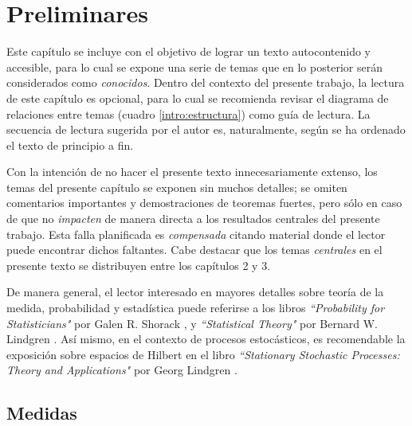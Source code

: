 
\chapter{Preliminares}

Este capítulo se incluye con el objetivo de lograr un texto autocontenido y accesible, para lo cual se expone una serie de temas que en lo posterior serán considerados como \textit{conocidos}.
%
Dentro del contexto del presente trabajo, la lectura de este capítulo es opcional, para lo cual se recomienda revisar el diagrama de relaciones entre temas (cuadro \ref{intro:estructura}) como guía de lectura.
%
La secuencia de lectura sugerida por el autor es, naturalmente, según se ha ordenado el texto de principio a fin.

Con la intención de no hacer el presente texto innecesariamente extenso, los temas del presente capítulo se exponen sin muchos detalles; se omiten comentarios importantes y demostraciones de teoremas fuertes, pero sólo en caso de que no \textit{impacten} de manera directa a los resultados centrales del presente trabajo.
%
Esta falla planificada es \textit{compensada} citando material donde el lector puede encontrar dichos faltantes.
%
Cabe destacar que los temas \textit{centrales} en el presente texto se distribuyen entre los capítulos 2 y 3.

De manera general, el lector interesado en mayores detalles sobre teoría de la medida, probabilidad y estadística puede referirse a los libros \textit{``Probability for Statisticians"} por Galen R. Shorack \cite{probabilidad_shorack}, y \textit{``Statistical Theory"} por Bernard W. Lindgren \cite{estadistica_lindgren}.
%
Así mismo, en el contexto de procesos estocásticos, es recomendable la exposición sobre espacios de Hilbert en el libro \textit{``Stationary Stochastic Processes: Theory and Applications"} por Georg Lindgren \cite{estacionariedad_lindgren}.


\section{Medidas}

